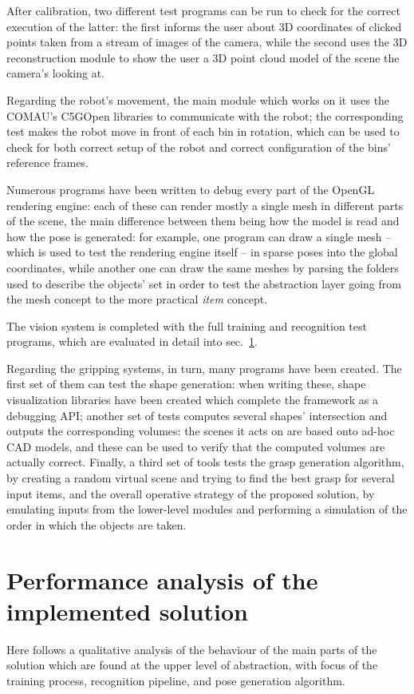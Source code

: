 After calibration, two different test programs can be run to check
for the correct execution of the latter: the first informs the user
about 3D coordinates of clicked points taken from a stream of images of
the camera, while the second uses the 3D reconstruction module to show
the user a 3D point cloud model of the scene the camera's looking at.

Regarding the robot's movement, the main module which works on it uses
the COMAU's C5GOpen libraries to communicate with the robot; the
corresponding test makes the robot move in front of each bin in
rotation, which can be used to check for both correct setup of the
robot and correct configuration of the bins' reference frames.

Numerous programs have been written to debug every part of the
OpenGL rendering engine: each of these can render mostly a single
mesh in different parts of the scene, the main difference between them
being how the model is read and how the pose is generated: for
example, one program can draw a single mesh -- which is used to test
the rendering engine itself -- in sparse poses into the global
coordinates, while another one can draw the same meshes by parsing 
the folders used to describe the objects' set in order to test the
abstraction layer going from the mesh concept to the more practical
\emph{item} concept.

The vision system is completed with the full training and recognition
test programs, which are evaluated in detail into
sec.~\ref{sec:result-tests}.

Regarding the gripping systems, in turn, many programs have been
created. The first set of them can test the shape generation: when
writing these, shape visualization libraries have been created which
complete the framework as a debugging API; another set of tests
computes several shapes' intersection and outputs the corresponding
volumes: the scenes it acts on are based onto ad-hoc CAD models, and
these can be used to verify that the computed volumes are actually
correct. Finally, a third set of tools tests the grasp generation
algorithm, by creating a random virtual scene and trying to find the best
grasp for several input items, and the overall operative strategy of
the proposed solution, by emulating inputs from the lower-level
modules and performing a simulation of the order in which the objects
are taken.

\section{Performance analysis of the implemented solution} \label{sec:result-tests}
Here follows a qualitative analysis of the behaviour of the main parts
of the solution which are found at the upper level of abstraction,
with focus of the training process, recognition pipeline, and pose
generation algorithm.

